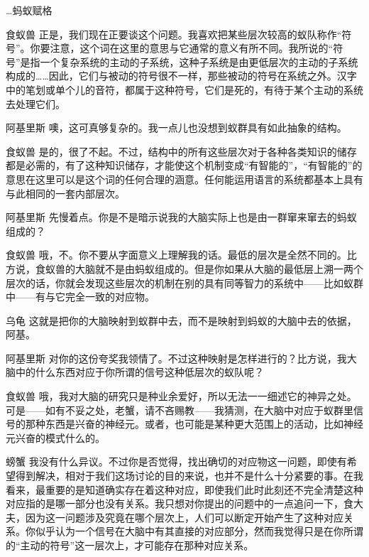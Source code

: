 \begin{dialog}{…蚂蚁赋格}
\begin{dialogue}
\item[食蚁兽]正是，我们现在正要谈这个问题。我喜欢把某些层次较高的蚁队称作“符号”。你要注意，这个词在这里的意思与它通常的意义有所不同。我所说的“符号”是指一个复杂系统的主动的子系统，这种子系统是由更低层次的主动的子系统构成的……因此，它们与被动的符号很不一样，那些被动的符号在系统之外。汉字中的笔划或单个儿的音符，都属于这种符号，它们是死的，有待于某个主动的系统去处理它们。

\item[阿基里斯]噢，这可真够复杂的。我一点儿也没想到蚁群具有如此抽象的结构。

\item[食蚁兽]是的，很了不起。不过，结构中的所有这些层次对于各种各类知识的储存都是必需的，有了这种知识储存，才能使这个机制变成“有智能的”，“有智能的”的意思在这里可以是这个词的任何合理的涵意。任何能运用语言的系统都基本上具有与此相同的一套内部层次。

\item[阿基里斯]先慢着点。你是不是暗示说我的大脑实际上也是由一群窜来窜去的蚂蚁组成的？

\item[食蚁兽]哦，不。你不要从字面意义上理解我的话。最低的层次是全然不同的。比方说，食蚁兽的大脑就不是由蚂蚁组成的。但是你如果从大脑的最低层上溯一两个层次的话，你就会发现这些层次的机制在别的具有同等智力的系统中——比如蚁群中——有与它完全一致的对应物。

\item[乌龟]这就是把你的大脑映射到蚁群中去，而不是映射到蚂蚁的大脑中去的依据，阿基。

\item[阿基里斯]对你的这份夸奖我领情了。不过这种映射是怎样进行的？比方说，我大脑中的什么东西对应于你所谓的信号这种低层次的蚁队呢？

\item[食蚁兽]哦，我对大脑的研究只是种业余爱好，所以无法一一细述它的神异之处。可是——如有不妥之处，老蟹，请不吝赐教——我猜测，在大脑中对应于蚁群里信号的那种东西是兴奋的神经元。或者，也可能是某种更大范围上的活动，比如神经元兴奋的模式什么的。

\item[螃蟹]我没有什么异议。不过你是否觉得，找出确切的对应物这一问题，即使有希望得到解决，相对于我们这场讨论的目的来说，也并不是什么十分紧要的事。在我看来，最重要的是知道确实存在着这种对应，即使我们此时此刻还不完全清楚这种对应指的是哪一部分也没有关系。我只想对你提出的问题中的一点追问一下，食大夫，因为这一问题涉及究竟在哪个层次上，人们可以断定开始产生了这种对应关系。你似乎认为一个信号在大脑中有其直接的对应部分，然而我觉得只是在你所谓的“主动的符号”这一层次上，才可能存在那种对应关系。


\end{dialogue}
\end{dialog}
